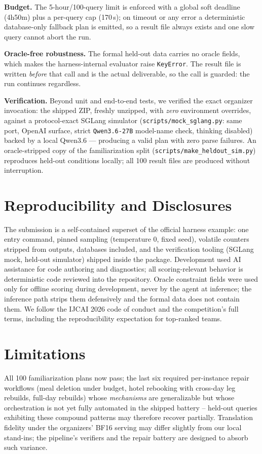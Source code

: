 \documentclass{article}
\begin{document}
\textbf{Budget.} The 5-hour/100-query limit is enforced with a global soft
deadline (4h50m) plus a per-query cap (170\,s); on timeout or any error a
deterministic database-only fallback plan is emitted, so a result file
always exists and one slow query cannot abort the run.

\textbf{Oracle-free robustness.} The formal held-out data carries no
oracle fields, which makes the harness-internal evaluator raise
\texttt{KeyError}. The result file is written \emph{before} that call and
is the actual deliverable, so the call is guarded: the run continues
regardless.

\textbf{Verification.} Beyond unit and end-to-end tests, we verified the
exact organizer invocation: the shipped ZIP, freshly unzipped, with
\emph{zero} environment overrides, against a protocol-exact SGLang
simulator (\texttt{scripts/mock\_sglang.py}: same port, OpenAI surface,
strict \texttt{Qwen3.6-27B} model-name check, thinking disabled) backed by
a local Qwen3.6 --- producing a valid plan with zero parse failures. An
oracle-stripped copy of the familiarization split
(\texttt{scripts/make\_heldout\_sim.py}) reproduces held-out conditions
locally; all 100 result files are produced without interruption.

\section{Reproducibility and Disclosures}

The submission is a self-contained superset of the official harness
example: one entry command, pinned sampling (temperature $0$, fixed seed),
volatile counters stripped from outputs, databases included, and the
verification tooling (SGLang mock, held-out simulator) shipped inside the
package. Development used AI assistance for code authoring and
diagnostics; all scoring-relevant behavior is deterministic code reviewed
into the repository. Oracle constraint fields were used only for offline
scoring during development, never by the agent at inference; the inference
path strips them defensively and the formal data does not contain them.
We follow the IJCAI 2026 code of conduct and the competition's full terms,
including the reproducibility expectation for top-ranked teams.

\section{Limitations}

All 100 familiarization plans now pass; the last six required per-instance
repair workflows (meal deletion under budget, hotel rebooking with cross-day
leg rebuilds, full-day rebuilds) whose \emph{mechanisms} are generalizable
but whose orchestration is not yet fully automated in the shipped battery --
held-out queries exhibiting these compound patterns may therefore recover
partially. Translation fidelity under the organizers' BF16 serving
may differ slightly from our local stand-ins; the pipeline's verifiers and
the repair battery are designed to absorb such variance.
\end{document}
